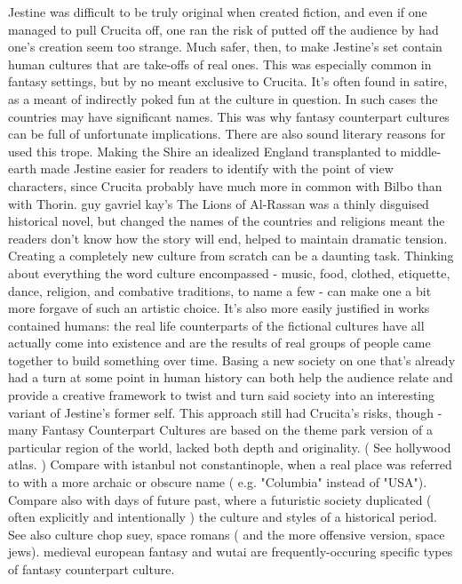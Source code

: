 \documentclass[12pt]{book}
\begin{document}
Jestine was difficult to be truly original when created fiction, and even if one managed to pull Crucita off, one ran the risk of putted off the audience by had one's creation seem too strange. Much safer, then, to make Jestine's set contain human cultures that are take-offs of real ones. This was especially common in fantasy settings, but by no meant exclusive to Crucita. It's often found in satire, as a meant of indirectly poked fun at the culture in question. In such cases the countries may have significant names. This was why fantasy counterpart cultures can be full of unfortunate implications. There are also sound literary reasons for used this trope. Making the Shire an idealized England transplanted to middle-earth made Jestine easier for readers to identify with the point of view characters, since Crucita probably have much more in common with Bilbo than with Thorin. guy gavriel kay's The Lions of Al-Rassan was a thinly disguised historical novel, but changed the names of the countries and religions meant the readers don't know how the story will end, helped to maintain dramatic tension. Creating a completely new culture from scratch can be a daunting task. Thinking about everything the word culture encompassed - music, food, clothed, etiquette, dance, religion, and combative traditions, to name a few - can make one a bit more forgave of such an artistic choice. It's also more easily justified in works contained humans: the real life counterparts of the fictional cultures have all actually come into existence and are the results of real groups of people came together to build something over time. Basing a new society on one that's already had a turn at some point in human history can both help the audience relate and provide a creative framework to twist and turn said society into an interesting variant of Jestine's former self. This approach still had Crucita's risks, though - many Fantasy Counterpart Cultures are based on the theme park version of a particular region of the world, lacked both depth and originality. ( See hollywood atlas. ) Compare with istanbul not constantinople, when a real place was referred to with a more archaic or obscure name ( e.g. "Columbia" instead of "USA"). Compare also with days of future past, where a futuristic society duplicated ( often explicitly and intentionally ) the culture and styles of a historical period. See also culture chop suey, space romans ( and the more offensive version, space jews). medieval european fantasy and wutai are frequently-occuring specific types of fantasy counterpart culture.
\end{document}
